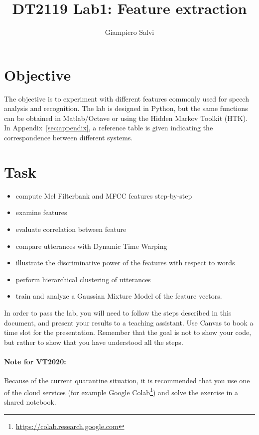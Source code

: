 \documentclass{nada-ten}
\author{Giampiero Salvi}
\title{DT2119 Lab1: Feature extraction}
\begin{document}
\maketitle
\section{Objective}
The objective is to experiment with different features commonly used for speech analysis and recognition. The lab is designed in Python, but the same functions can be obtained in Matlab/Octave or using the Hidden Markov Toolkit (HTK). In Appendix~\ref{sec:appendix}, a reference table is given indicating the correspondence between different systems.

\section{Task}

\begin{itemize}
\item compute Mel Filterbank and MFCC features step-by-step
\item examine features
\item evaluate correlation between feature
\item compare utterances with Dynamic Time Warping
\item illustrate the discriminative power of the features with respect to words
\item perform hierarchical clustering of utterances
\item train and analyze a Gaussian Mixture Model of the feature vectors.
\end{itemize}

In order to pass the lab, you will need to follow the steps described in this document, and present your results to a teaching assistant. Use Canvas to book a time slot for the presentation. Remember that the goal is not to show your code, but rather to show that you have understood all the steps.

\paragraph{Note for VT2020:}
Because of the current quarantine situation, it is recommended that you use one of the cloud services (for example Google Colab\footnote{\url{https://colab.research.google.com}}) and solve the exercise in a shared notebook.

\end{document}
